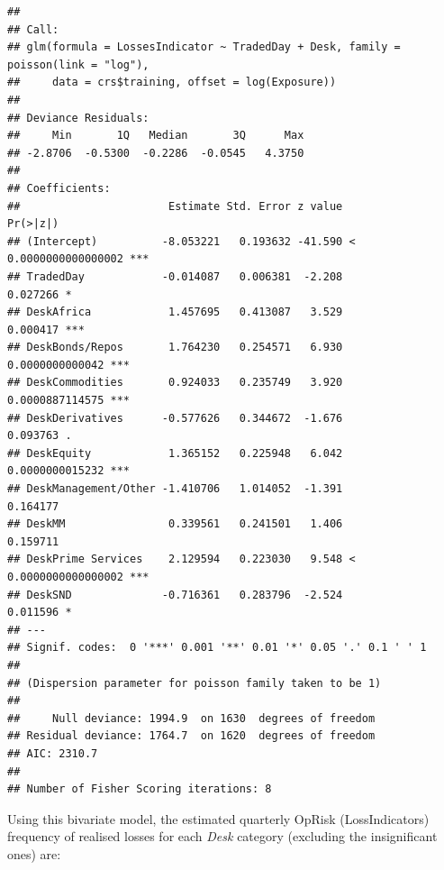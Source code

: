 \documentclass{DissertateUSU}
\begin{document}
\begin{verbatim}
## 
## Call:
## glm(formula = LossesIndicator ~ TradedDay + Desk, family = poisson(link = "log"), 
##     data = crs$training, offset = log(Exposure))
## 
## Deviance Residuals: 
##     Min       1Q   Median       3Q      Max  
## -2.8706  -0.5300  -0.2286  -0.0545   4.3750  
## 
## Coefficients:
##                       Estimate Std. Error z value             Pr(>|z|)    
## (Intercept)          -8.053221   0.193632 -41.590 < 0.0000000000000002 ***
## TradedDay            -0.014087   0.006381  -2.208             0.027266 *  
## DeskAfrica            1.457695   0.413087   3.529             0.000417 ***
## DeskBonds/Repos       1.764230   0.254571   6.930      0.0000000000042 ***
## DeskCommodities       0.924033   0.235749   3.920      0.0000887114575 ***
## DeskDerivatives      -0.577626   0.344672  -1.676             0.093763 .  
## DeskEquity            1.365152   0.225948   6.042      0.0000000015232 ***
## DeskManagement/Other -1.410706   1.014052  -1.391             0.164177    
## DeskMM                0.339561   0.241501   1.406             0.159711    
## DeskPrime Services    2.129594   0.223030   9.548 < 0.0000000000000002 ***
## DeskSND              -0.716361   0.283796  -2.524             0.011596 *  
## ---
## Signif. codes:  0 '***' 0.001 '**' 0.01 '*' 0.05 '.' 0.1 ' ' 1
## 
## (Dispersion parameter for poisson family taken to be 1)
## 
##     Null deviance: 1994.9  on 1630  degrees of freedom
## Residual deviance: 1764.7  on 1620  degrees of freedom
## AIC: 2310.7
## 
## Number of Fisher Scoring iterations: 8
\end{verbatim}

\doublespacing

Using this bivariate model, the estimated quarterly OpRisk
(LossIndicators) frequency of realised losses for each \emph{Desk}
category (excluding the insignificant ones) are:
\end{document}
